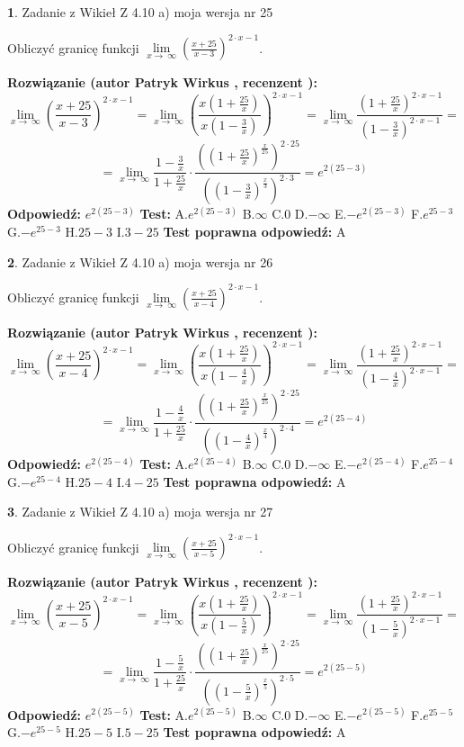 \documentclass[12pt, a4paper]{article}
\theoremstyle{definition} %
\newtheorem{zad}{}
\newcommand{\zadStart}[1]{\begin{zad}#1\newline}
\newcommand{\zadStop}{\end{zad}}
\newcommand{\rozwStart}[2]{\noindent \textbf{Rozwiązanie (autor #1 , recenzent #2): }\newline}
\newcommand{\rozwStop}{\newline}
\newcommand{\odpStart}{\noindent \textbf{Odpowiedź:}\newline}
\newcommand{\odpStop}{\newline}
\newcommand{\testStart}{\noindent \textbf{Test:}\newline}
\newcommand{\testStop}{\newline}
\newcommand{\kluczStart}{\noindent \textbf{Test poprawna odpowiedź:}\newline}
\newcommand{\kluczStop}{\newline}
\begin{document}
\zadStart{Zadanie z Wikieł Z 4.10 a) moja wersja nr 25}


Obliczyć granicę funkcji  $\lim\limits_{x\to\ \infty}(\frac{x+25}{x-3})^{2\cdot x-1}$.
\zadStop
\rozwStart{Patryk Wirkus}{}
$$\lim\limits_{x\to\ \infty}(\frac{x+25}{x-3})^{2\cdot x-1} = \lim\limits_{x\to\ \infty}(\frac{x(1+\frac{25}{x})}{x(1-\frac{3}{x})})^{2\cdot x-1}=\lim\limits_{x\to\ \infty}\frac{(1+\frac{25}{x})^{2\cdot x-1}}{(1-\frac{3}{x})^{2\cdot x-1}}=$$
$$=\lim\limits_{x\to\ \infty}\frac{1-\frac{3}{x}}{1+\frac{25}{x}}\cdot\frac{((1+\frac{25}{x})^{\frac{x}{25}})^{2\cdot25}}{((1-\frac{3}{x})^{\frac{x}{3}})^{2\cdot3}}=e^{2(25-3)}$$
\rozwStop
\odpStart
$e^{2(25-3)}$
\odpStop
\testStart
A.$e^{2(25-3)}$ B.$\infty$ C.$0$ D.$-\infty$ E.$-e^{2(25-3)}$
F.$e^{25-3}$ G.$-e^{25-3}$
H.$25-3$
I.$3-25$
\testStop
\kluczStart
A
\kluczStop



\zadStart{Zadanie z Wikieł Z 4.10 a) moja wersja nr 26}


Obliczyć granicę funkcji  $\lim\limits_{x\to\ \infty}(\frac{x+25}{x-4})^{2\cdot x-1}$.
\zadStop
\rozwStart{Patryk Wirkus}{}
$$\lim\limits_{x\to\ \infty}(\frac{x+25}{x-4})^{2\cdot x-1} = \lim\limits_{x\to\ \infty}(\frac{x(1+\frac{25}{x})}{x(1-\frac{4}{x})})^{2\cdot x-1}=\lim\limits_{x\to\ \infty}\frac{(1+\frac{25}{x})^{2\cdot x-1}}{(1-\frac{4}{x})^{2\cdot x-1}}=$$
$$=\lim\limits_{x\to\ \infty}\frac{1-\frac{4}{x}}{1+\frac{25}{x}}\cdot\frac{((1+\frac{25}{x})^{\frac{x}{25}})^{2\cdot25}}{((1-\frac{4}{x})^{\frac{x}{4}})^{2\cdot4}}=e^{2(25-4)}$$
\rozwStop
\odpStart
$e^{2(25-4)}$
\odpStop
\testStart
A.$e^{2(25-4)}$ B.$\infty$ C.$0$ D.$-\infty$ E.$-e^{2(25-4)}$
F.$e^{25-4}$ G.$-e^{25-4}$
H.$25-4$
I.$4-25$
\testStop
\kluczStart
A
\kluczStop



\zadStart{Zadanie z Wikieł Z 4.10 a) moja wersja nr 27}


Obliczyć granicę funkcji  $\lim\limits_{x\to\ \infty}(\frac{x+25}{x-5})^{2\cdot x-1}$.
\zadStop
\rozwStart{Patryk Wirkus}{}
$$\lim\limits_{x\to\ \infty}(\frac{x+25}{x-5})^{2\cdot x-1} = \lim\limits_{x\to\ \infty}(\frac{x(1+\frac{25}{x})}{x(1-\frac{5}{x})})^{2\cdot x-1}=\lim\limits_{x\to\ \infty}\frac{(1+\frac{25}{x})^{2\cdot x-1}}{(1-\frac{5}{x})^{2\cdot x-1}}=$$
$$=\lim\limits_{x\to\ \infty}\frac{1-\frac{5}{x}}{1+\frac{25}{x}}\cdot\frac{((1+\frac{25}{x})^{\frac{x}{25}})^{2\cdot25}}{((1-\frac{5}{x})^{\frac{x}{5}})^{2\cdot5}}=e^{2(25-5)}$$
\rozwStop
\odpStart
$e^{2(25-5)}$
\odpStop
\testStart
A.$e^{2(25-5)}$ B.$\infty$ C.$0$ D.$-\infty$ E.$-e^{2(25-5)}$
F.$e^{25-5}$ G.$-e^{25-5}$
H.$25-5$
I.$5-25$
\testStop
\kluczStart
A
\kluczStop
\end{document}

